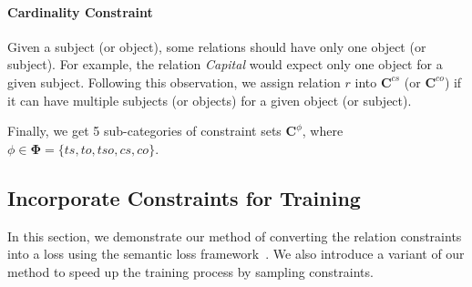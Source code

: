 
\paragraph{Cardinality Constraint}
Given a subject (or object), some relations should have only one object (or subject).
For example, the relation \emph{Capital} would expect only one object for a given subject.
Following this observation, we assign relation $r$ into $\bm{C}^{cs}$ (or $\bm{C}^{co}$) if it can have multiple subjects (or objects) for a given object (or subject).



Finally, we get 5 sub-categories of constraint sets $\bm{C}^{\phi}$, where $\phi \in\bm{\Phi}=\{ts, to, tso, cs, co\}$.

\subsection{Incorporate  Constraints for Training}
\label{sec:loss_term}
In this section, we demonstrate our method of converting the relation constraints into a loss using the semantic loss framework~\cite{xu2017semantic}.
We also introduce a variant of our method to speed up the training process by sampling constraints.

